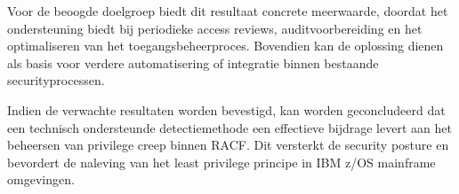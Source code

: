 Voor de beoogde doelgroep biedt dit resultaat concrete meerwaarde, doordat het ondersteuning biedt bij periodieke access reviews, auditvoorbereiding en het optimaliseren van het toegangsbeheerproces. Bovendien kan de oplossing dienen als basis voor verdere automatisering of integratie binnen bestaande securityprocessen.

Indien de verwachte resultaten worden bevestigd, kan worden geconcludeerd dat een technisch ondersteunde detectiemethode een effectieve bijdrage levert aan het beheersen van privilege creep binnen RACF. Dit versterkt de security posture en bevordert de naleving van het least privilege principe in IBM z/OS mainframe omgevingen.

